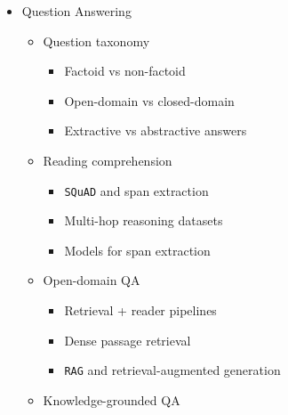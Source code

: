\documentclass[
]{article}
\providecommand{\tightlist}{%
  \setlength{\itemsep}{0pt}\setlength{\parskip}{0pt}}
\begin{document}
\begin{itemize}
\begin{itemize}
    \begin{itemize}
    \tightlist
    \item
      Aggregating across sources
    \item
      Redundancy and contradiction handling
    \end{itemize}
  \item
    Evaluation

    \begin{itemize}
    \tightlist
    \item
      \texttt{ROUGE} family of metrics
    \item
      \texttt{BERTScore} for summarization
    \item
      Faithfulness and hallucination
    \item
      Human evaluation criteria
    \end{itemize}
  \end{itemize}
\item
  Question Answering

  \begin{itemize}
  \tightlist
  \item
    Question taxonomy

    \begin{itemize}
    \tightlist
    \item
      Factoid vs non-factoid
    \item
      Open-domain vs closed-domain
    \item
      Extractive vs abstractive answers
    \end{itemize}
  \item
    Reading comprehension

    \begin{itemize}
    \tightlist
    \item
      \texttt{SQuAD} and span extraction
    \item
      Multi-hop reasoning datasets
    \item
      Models for span extraction
    \end{itemize}
  \item
    Open-domain QA

    \begin{itemize}
    \tightlist
    \item
      Retrieval + reader pipelines
    \item
      Dense passage retrieval
    \item
      \texttt{RAG} and retrieval-augmented generation
    \end{itemize}
  \item
    Knowledge-grounded QA


\end{itemize}
\end{itemize}
\end{document}
